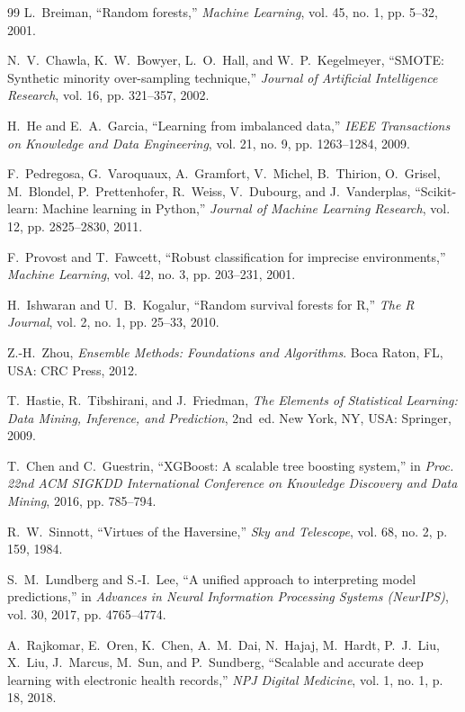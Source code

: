 \documentclass[conference]{IEEEtran}
\begin{document}
\begin{thebibliography}{99}
L.~Breiman, ``Random forests,'' \textit{Machine Learning}, vol. 45, no. 1, pp. 5--32, 2001.

N.~V.~Chawla, K.~W.~Bowyer, L.~O.~Hall, and W.~P.~Kegelmeyer, ``SMOTE: Synthetic minority over-sampling technique,'' \textit{Journal of Artificial Intelligence Research}, vol. 16, pp. 321--357, 2002.

H.~He and E.~A.~Garcia, ``Learning from imbalanced data,'' \textit{IEEE Transactions on Knowledge and Data Engineering}, vol. 21, no. 9, pp. 1263--1284, 2009.

F.~Pedregosa, G.~Varoquaux, A.~Gramfort, V.~Michel, B.~Thirion, O.~Grisel, M.~Blondel, P.~Prettenhofer, R.~Weiss, V.~Dubourg, and J.~Vanderplas, ``Scikit-learn: Machine learning in Python,'' \textit{Journal of Machine Learning Research}, vol. 12, pp. 2825--2830, 2011.

F.~Provost and T.~Fawcett, ``Robust classification for imprecise environments,'' \textit{Machine Learning}, vol. 42, no. 3, pp. 203--231, 2001.

H.~Ishwaran and U.~B.~Kogalur, ``Random survival forests for R,'' \textit{The R Journal}, vol. 2, no. 1, pp. 25--33, 2010.

Z.-H.~Zhou, \textit{Ensemble Methods: Foundations and Algorithms}. Boca Raton, FL, USA: CRC Press, 2012.

T.~Hastie, R.~Tibshirani, and J.~Friedman, \textit{The Elements of Statistical Learning: Data Mining, Inference, and Prediction}, 2nd~ed. New York, NY, USA: Springer, 2009.

T.~Chen and C.~Guestrin, ``XGBoost: A scalable tree boosting system,'' in \textit{Proc. 22nd ACM SIGKDD International Conference on Knowledge Discovery and Data Mining}, 2016, pp. 785--794.

R.~W.~Sinnott, ``Virtues of the Haversine,'' \textit{Sky and Telescope}, vol. 68, no. 2, p. 159, 1984.

S.~M.~Lundberg and S.-I.~Lee, ``A unified approach to interpreting model predictions,'' in \textit{Advances in Neural Information Processing Systems (NeurIPS)}, vol. 30, 2017, pp. 4765--4774.

A.~Rajkomar, E.~Oren, K.~Chen, A.~M.~Dai, N.~Hajaj, M.~Hardt, P.~J.~Liu, X.~Liu, J.~Marcus, M.~Sun, and P.~Sundberg, ``Scalable and accurate deep learning with electronic health records,'' \textit{NPJ Digital Medicine}, vol. 1, no. 1, p. 18, 2018.


\end{thebibliography}
\end{document}
